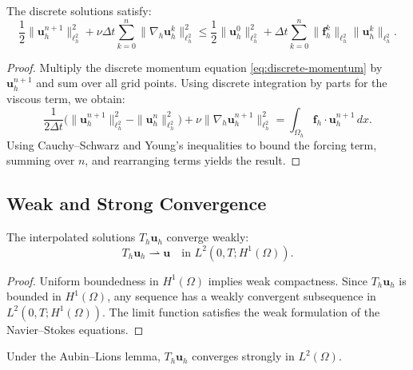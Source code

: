 \begin{lemma}
The discrete solutions satisfy:
\begin{equation}
\frac{1}{2} \|\mathbf{u}_h^{n+1}\|_{\ell^2_h}^2 + \nu \Delta t \sum_{k=0}^n \|\nabla_h \mathbf{u}_h^k\|_{\ell^2_h}^2 \leq \frac{1}{2} \|\mathbf{u}_h^0\|_{\ell^2_h}^2 + \Delta t \sum_{k=0}^n \|\mathbf{f}_h^k\|_{\ell^2_h} \|\mathbf{u}_h^k\|_{\ell^2_h}.
\end{equation}
\end{lemma}

\begin{proof}
Multiply the discrete momentum equation \eqref{eq:discrete-momentum} by $\mathbf{u}_h^{n+1}$ and sum over all grid points. Using discrete integration by parts for the viscous term, we obtain:
\begin{equation}
\frac{1}{2\Delta t} \Big(\|\mathbf{u}_h^{n+1}\|_{\ell^2_h}^2 - \|\mathbf{u}_h^n\|_{\ell^2_h}^2\Big) + \nu \|\nabla_h \mathbf{u}_h^{n+1}\|_{\ell^2_h}^2 = \int_{\Omega_h} \mathbf{f}_h \cdot \mathbf{u}_h^{n+1} \, dx.
\end{equation}
Using Cauchy--Schwarz and Young's inequalities to bound the forcing term, summing over $n$, and rearranging terms yields the result.
\end{proof}

\subsection{Weak and Strong Convergence}

\begin{theorem}
The interpolated solutions $T_h \mathbf{u}_h$ converge weakly:
\begin{equation}
T_h \mathbf{u}_h \rightharpoonup \mathbf{u} \quad \text{in } L^2(0,T; H^1(\Omega)).
\end{equation}
\end{theorem}

\begin{proof}
Uniform boundedness in $H^1(\Omega)$ implies weak compactness. Since $T_h \mathbf{u}_h$ is bounded in $H^1(\Omega)$, any sequence has a weakly convergent subsequence in $L^2(0,T; H^1(\Omega))$. The limit function satisfies the weak formulation of the Navier--Stokes equations.
\end{proof}

\begin{theorem}
Under the Aubin--Lions lemma, $T_h \mathbf{u}_h$ converges strongly in $L^2(\Omega)$.
\end{theorem}

